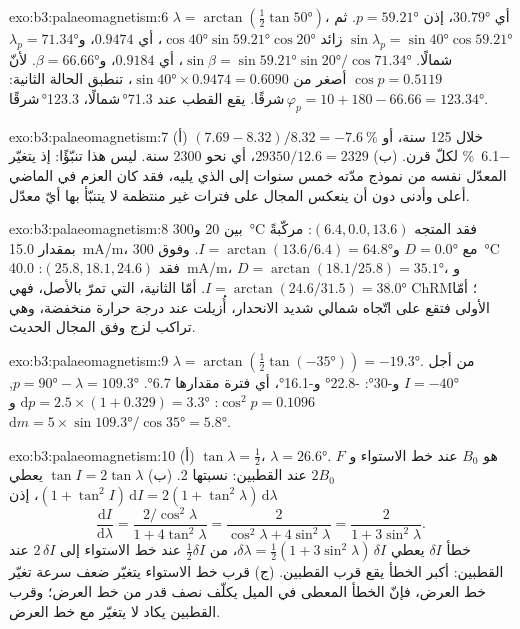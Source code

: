 \begin{solution}{exo:b3:palaeomagnetism:6}
\sloppy $\lambda = \arctan(\tfrac12\tan\ang{50})$، أي $\ang{30.79}$، إذن $p = \ang{59.21}$.
ثم $\sin\lambda_p = \sin\ang{40}\cos\ang{59.21}$ زائد $\cos\ang{40}\sin\ang{59.21}
\cos\ang{20}$، أي $0.9474$، و$\lambda_p = \ang{71.34}$\,شمالًا. $\sin\beta =
\sin\ang{59.21}\sin\ang{20}/\cos\ang{71.34}$، أي $0.9184$، و$\beta = \ang{66.66}$.
لأنّ $\cos p = 0.5119$ أصغر من $\sin\ang{40}\times0.9474 = 0.6090$، تنطبق الحالة الثانية:
$\varphi_p = 10 + 180 - 66.66 = \ang{123.34}$\,شرقًا. يقع القطب عند
\ang{71.3}\,شمالًا، \ang{123.3}\,شرقًا.
\end{solution}

\begin{solution}{exo:b3:palaeomagnetism:7}
(أ) $(7.69 - 8.32)/8.32 = \qty{-7.6}{\percent}$ خلال 125 سنة، أو
\qty{-6.1}{\percent} لكلّ قرن. (ب) $29350/12.6 = 2329$، أي نحو 2300 سنة.
ليس هذا تنبّؤًا: إذ يتغيّر المعدّل نفسه من نموذج مدّته خمس سنوات إلى
الذي يليه، فقد كان العزم في الماضي أعلى وأدنى دون أن
ينعكس المجال على فترات غير منتظمة لا
يتنبّأ بها أيّ معدّل.
\end{solution}

\begin{solution}{exo:b3:palaeomagnetism:8}
بين 20 و\qty{300}{\celsius} فقد المتجه $(6.4, 0.0, 13.6)$: مركّبةً
بمقدار \qty{15.0}{mA/m}، مع $D = \ang{0.0}$
و$I = \arctan(13.6/6.4) = \ang{64.8}$. وفوق \qty{300}{\celsius} فقد $(25.8, 18.1, 24.6)$:
\qty{40.0}{mA/m}، $D = \arctan(18.1/25.8) = \ang{35.1}$، و$I =
\arctan(24.6/31.5) = \ang{38.0}$. أمّا الثانية، التي تمرّ بالأصل، فهي
ChRM؛ أمّا الأولى فتقع على اتّجاه شمالي شديد الانحدار، أُزيلت عند
درجة حرارة منخفضة، وهي تراكب لزج وفق المجال الحديث.
\end{solution}

\begin{solution}{exo:b3:palaeomagnetism:9}
$\lambda = \arctan(\tfrac12\tan(\ang{-35})) = \ang{-19.3}$. من أجل $I = \ang{-40}$
و\ang{-30}: \ang{-22.8} و\ang{-16.1}، أي فترة مقدارها \ang{6.7}.
$p = \ang{90} - \lambda = \ang{109.3}$, $\cos^2p = 0.1096$:
$\mathrm dp = 2.5\times(1 + 0.329) = \ang{3.3}$ و$\mathrm dm =
5\times\sin\ang{109.3}/\cos\ang{35} = \ang{5.8}$.
\end{solution}

\begin{solution}{exo:b3:palaeomagnetism:10}
(أ) $\tan\lambda = \tfrac12$، $\lambda = \ang{26.6}$. $F$ هو $B_0$ عند
خط الاستواء و$2B_0$ عند القطبين: نسبتها 2. (ب) $\tan I = 2\tan\lambda$
يعطي $(1 + \tan^2I)\,\mathrm dI = 2(1 + \tan^2\lambda)\,\mathrm d\lambda$، إذن
\[
  \frac{\mathrm dI}{\mathrm d\lambda} = \frac{2/\cos^2\lambda}{1 + 4\tan^2\lambda}
  = \frac{2}{\cos^2\lambda + 4\sin^2\lambda} = \frac{2}{1 + 3\sin^2\lambda}.
\]
خطأ $\delta I$ يعطي $\delta\lambda = \tfrac12(1 + 3\sin^2\lambda)\,\delta I$،
من $\tfrac12\delta I$ عند خط الاستواء إلى $2\,\delta I$ عند القطبين: أكبر
الخطأ يقع قرب القطبين. (ج) قرب خط الاستواء يتغيّر 
ضعف سرعة تغيّر خط العرض، فإنّ الخطأ المعطى في الميل يكلّف نصف
قدر من خط العرض؛ وقرب القطبين يكاد  لا يتغيّر مع خط العرض.
\end{solution}

